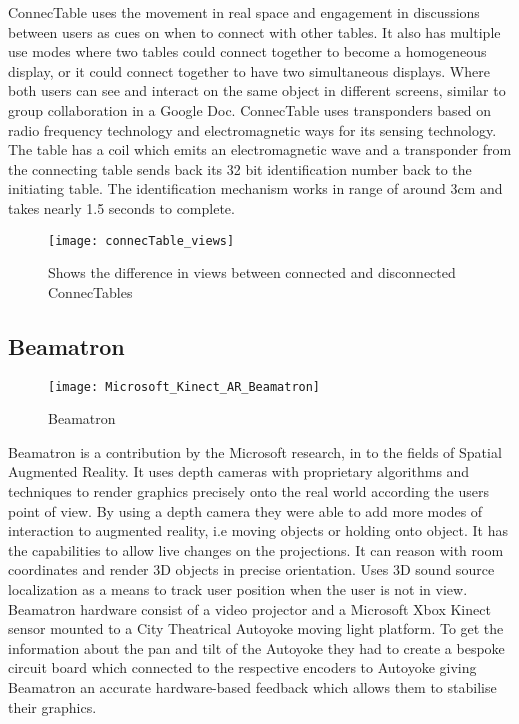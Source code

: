 ConnecTable uses the movement in real space and engagement in discussions
between users as cues on when to connect with other tables. It also
has multiple use modes where two tables could connect together to
become a homogeneous display, or it could connect together to have
two simultaneous displays. Where both users can see and interact on
the same object in different screens, similar to group collaboration
in a Google Doc. ConnecTable uses transponders based on radio frequency
technology and electromagnetic ways for its sensing technology. The
table has a coil which emits an electromagnetic wave and a transponder
from the connecting table sends back its 32 bit identification number
back to the initiating table. The identification mechanism works in
range of around 3cm and takes nearly 1.5 seconds to complete.

\begin{figure}[h]

\texttt{[image: connecTable\_views]}
\protect\caption{Shows the difference in views between connected and disconnected ConnecTables}
\end{figure}

\subsection{Beamatron}

\begin{figure}[H]
\texttt{[image: Microsoft\_Kinect\_AR\_Beamatron]}

\protect\caption{Beamatron}


\end{figure}


Beamatron \cite{beamatron} is a contribution by the Microsoft research,
in to the fields of Spatial Augmented Reality. It uses depth cameras
with proprietary algorithms and techniques to render graphics precisely
onto the real world according the users point of view. By using a
depth camera they were able to add more modes of interaction to augmented
reality, i.e moving objects or holding onto object. It has the capabilities
to allow live changes on the projections. It can reason with room
coordinates and render 3D objects in precise orientation. Uses 3D
sound source localization as a means to track user position when the
user is not in view. 
Beamatron hardware consist of a video projector and a Microsoft Xbox
Kinect sensor mounted to a City Theatrical Autoyoke\cite{autoyoke}
moving light platform. To get the information about the pan and tilt
of the Autoyoke they had to create a bespoke circuit board which connected
to the respective encoders to Autoyoke giving Beamatron an accurate
hardware-based feedback which allows them to stabilise their graphics. 

